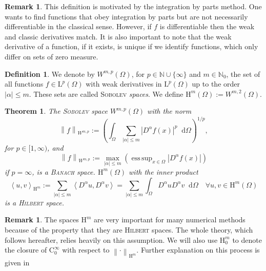 \documentclass[12pt,a4paper,twoside, open=right]{scrreprt}
\theoremstyle{definition}
\newtheorem{rem}[auf]{Remark}
\newtheorem{defn}[auf]{Definition}
\theoremstyle{plain}
\newtheorem{sa}[auf]{Theorem}
\DeclareMathOperator*{\esssup}{ess\,sup} %
\newcommand{\abs}[1]{\left\vert #1\right\vert}
\newcommand{\dotp}[2]{\left\langle #1,#2\right\rangle}
\newcommand{\nn}{\mathbb{N}}
\newcommand{\norm}[1]{\left\lVert#1\right\rVert}
\newcommand{\D}{\mathop{}\!\mathrm{d}}
\begin{document}
\begin{rem}
    This definition is motivated by the integration by parts method. One wants to find functions that obey integration by parts but are not necessarily differentiable in the classical sense. However, if $f$ is differentiable then the weak and classic derivatives match. It is also important to note that the weak derivative of a function, if it exists, is unique if we identify functions, which only differ on sets of zero measure.
\end{rem}
\begin{defn}
    We denote by $W^{m,p}(\Omega)$, for $p\in\nn\cup\{\infty\}$ and $m\in\nn_0$, the set of all functions $f\in \mathrm{L}^p(\Omega)$ with weak derivatives in $\mathrm{L}^p(\Omega)$ up to the order $\abs{\alpha}\le m$. These sets are called \textsc{Sobolev} \emph{spaces}. We define $\mathrm{H}^m(\Omega):=W^{m,2}(\Omega)$.
\end{defn}
\begin{sa}
    The \textsc{Sobolev} space $W^{m,p}(\Omega)$ with the norm
    \begin{equation}
        \norm{f}_{W^{m,p}}:=\left(\int_\Omega\sum_{\abs{\alpha}\le m}\abs{D^{\alpha} f(x)}^p\D\Omega\right)^{1/p},
    \end{equation}
    for $p\in[1,\infty)$, and 
    \begin{equation}
        \norm{f}_{W^{m,p}}:=\max_{\abs{\alpha}\le m}\left(\esssup_{x\in\Omega}\abs{D^{\alpha}f(x)}\right)
    \end{equation}
    if $p=\infty$, is a \textsc{Banach} space. $\mathrm{H}^m(\Omega)$ with the inner product
    \begin{equation}
        \dotp{u}{v}_{\mathrm{H}^m}:=\sum_{\abs{\alpha}\le m}\dotp{D^{\alpha}u}{D^{\alpha}v}=\sum_{\abs{\alpha}\le m}\int_\Omega D^\alpha u D^\alpha v\D\Omega \quad \forall u,v\in \mathrm{H}^m(\Omega)
    \end{equation}
    is a \textsc{Hilbert} space.
\end{sa}
\begin{rem}
    The spaces $\mathrm{H}^m$ are very important for many numerical methods because of the property that they are \textsc{Hilbert} spaces. The whole theory, which follows hereafter, relies heavily on this assumption. We will also use $\mathrm{H}_0^m$ to denote the closure of $\mathrm{C}^\infty_0$ with respect to $\norm{\cdot}_{\mathrm{H}^m}$. Further explanation on this process is given in \cite{Jost2013}
\end{rem}
\end{document}
